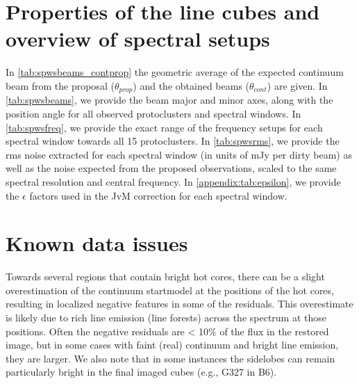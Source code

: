 \section{Properties of the line cubes and overview of spectral setups}
\label{appendix:spectral_setups}
In \cref{tab:spwsbeams_contprop} the geometric average of the expected continuum beam from the proposal ($\theta_{prop}$) and the obtained beams ($\theta_{cont}$) are given. In \cref{tab:spwsbeams}, we provide the beam major and minor axes, along with the position angle for all observed protoclusters and spectral windows. In \cref{tab:spwsfreq}, we provide the exact range of the frequency setups for each spectral window towards all 15 protoclusters. In \cref{tab:spwsrms}, we provide the rms noise extracted for each spectral window (in units of mJy per dirty beam) as well as the noise expected from the proposed observations, scaled to the same spectral resolution and central frequency. In \cref{appendix:tab:epsilon}, we provide the $\epsilon$ factors used in the JvM correction for each spectral window.




\section{Known data issues}

Towards several regions that contain bright hot cores, there can be a slight overestimation of the continuum startmodel at the positions of the hot cores, resulting in localized negative features in some of the residuals. This overestimate is likely due to rich line emission (line forests) across the spectrum at those positions. Often the negative residuals are < 10\% of the flux in the restored image, but in some cases with faint (real) continuum and bright line emission, they are larger. We also note that in some instances the sidelobes can remain particularly bright in the final imaged cubes (e.g., G327 in B6). 